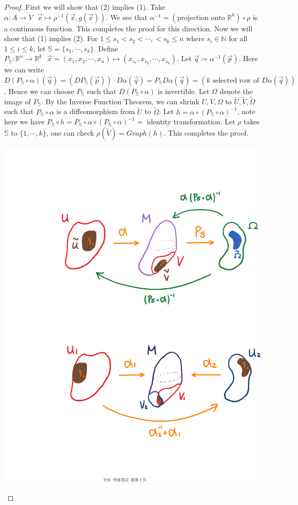 \documentclass[15pt]{book}
\theoremstyle{break}
\theoremstyle{break}
\newcommand{\R}{\mathbb{R}}
\newcommand{\N}{\mathbb{N}}
\begin{document}
\begin{proof}
First we will show that (2) implies (1). Take $\alpha: A \to V \ \ \ \vec{x} \mapsto \rho^{-1}(\vec{x},g(\vec{x}))$. We see that $\alpha^{-1} = (\text{projection onto }\R^k)\circ \rho$ is a continuous function. This completes the proof for this direction. Now we will show that (1) implies (2). For $1 \leq s_1 < s_2 <\cdots, < s_k \leq n$ where $s_i \in \N$ for all $1\leq i\leq k$, let $\mathbb{S} = \{s_1,\cdots, s_k\}$. Define $P_\mathbb{S}:\R^n \to \R^k \ \ \ \vec{x}=(x_1,x_2,\cdots,x_n)\mapsto(x_{s_1},x_{s_2},\cdots,x_{s_k})$. Let $\vec{q}\coloneqq \alpha^{-1}(\vec{p})$. Here we can write $D(P_\mathbb{S}\circ \alpha)(\vec{q})= (DP_\mathbb{S}(\vec{p})) \cdot D\alpha(\vec{q}) = P_\mathbb{S}D\alpha(\vec{q}) = (k \text{ selected row of }D\alpha(\vec{q}))$. Hence we can choose $P_\mathbb{S}$ such that $D(P_\mathbb{S}\circ \alpha)$ is invertible. Let $\Omega$ denote the image of $P_\mathbb{S}$. By the Inverse Function Theorem, we can shrink $U,V, \Omega$ to $\widetilde{U},\widetilde{V},\widetilde{\Omega}$ such that $P_\mathbb{S}\circ \alpha$ is a diffeomorphism from $\widetilde{U}$ to $\widetilde{\Omega}$. Let $h = \alpha\circ (P_\mathbb{S}\circ \alpha)^{-1}$, note here we have $P_\mathbb{S}\circ h = P_\mathbb{S}\circ \alpha\circ (P_\mathbb{S}\circ \alpha)^{-1} = $ identity transformation. Let $\rho$ takes $\mathbb{S}$ to $\{1,\cdots, k\}$, one can check $\rho(\widetilde{V}) = Graph(h)$. This completes the proof.
\begin{center}
\includegraphics[scale=0.69]{manifoldsDefn.pdf}

\end{center}
\end{proof}
\end{document}
